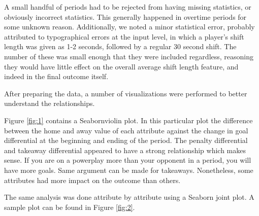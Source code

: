 \documentclass[twocolumn,letterpaper,12pt,notitlepage]{article}
\begin{document}
A small handful of periods had to be rejected from having missing statistics, or obviously incorrect
statistics. This generally happened in overtime periods for some unknown reason. Additionally, we noted
a minor statistical error, probably attributed to typographical errors at the input level, in which a player’s
shift length was given as 1-2 seconds, followed by a regular 30 second shift. The number of these was
small enough that they were included regardless, reasoning they would have little effect on the overall
average shift length feature, and indeed in the final outcome itself.

\begin{table}[t]
  \centering
  \caption{NHL game data prepared sample}
  \label{tab:1}
\end{table}

After preparing the data, a number of visualizations were performed to better understand the relationships. 

Figure \ref{fig:1} contains a Seabornviolin plot. In this particular plot the difference between the home and away value of each attribute against the change in goal differential at the beginning and ending of the period. The penalty differential and takeaway differential appeared to have a strong relationship which makes sense. If you are on a powerplay more than your opponent in a period, you will have more goals. Same argument can be made for takeaways. Nonetheless, some attributes had more impact on the outcome than others.

The same analysis was done attribute by attribute using a Seaborn joint plot. A sample plot can be found in Figure \ref{fig:2}.
\end{document}
